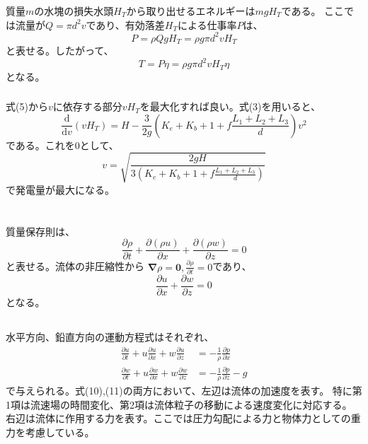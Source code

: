 \documentclass[a4paper]{jsarticle}
\begin{document}
\subsubsection{}
質量$m$の水塊の損失水頭$H_T$から取り出せるエネルギーは$mgH_T$である。
ここでは流量が$Q = \pi d^2 v$であり、有効落差$H_T$による仕事率$P$は、
\begin{equation}
  P = \rho Q g H_T = \rho g \pi d^2 v H_T
\end{equation}
と表せる。したがって、
\begin{equation}
  T = P \eta = \rho g \pi d^2 v H_T \eta
\end{equation}
となる。

\subsubsection{}
式(5)から$v$に依存する部分$v H_T$を最大化すれば良い。式(3)を用いると、
\begin{equation}
  \frac{\mathrm{d}}{\mathrm{d} v}(v H_T)
  = H - \frac{3}{2g} \left(K_e + K_b + 1 + f \frac{L_1 + L_2 + L_3}{d}\right) v^2
\end{equation}
である。これを0として、
\begin{equation}
  v = \sqrt{\frac{2 g H}{3 (K_e + K_b + 1 + f \frac{L_1 + L_2 + L_3}{d})}}
\end{equation}
で発電量が最大になる。

\section{}
\subsection{}
質量保存則は、
\begin{equation}
  \frac{\partial \rho}{\partial t}
  + \frac{\partial (\rho u)}{\partial x} 
  + \frac{\partial (\rho w)}{\partial z} = 0
\end{equation}
と表せる。流体の非圧縮性から
$\boldsymbol{\nabla} \rho = \boldsymbol{0},\frac{\partial \rho}{\partial t} = 0$であり、
\begin{equation}
  \frac{\partial u}{\partial x} 
  + \frac{\partial w}{\partial z} = 0
\end{equation}
となる。

\subsection{}
水平方向、鉛直方向の運動方程式はそれぞれ、
\begin{align}
  \frac{\partial u}{\partial t} + u \frac{\partial u}{\partial x} + w \frac{\partial u}{\partial z} &= -\frac{1}{\rho} \frac{\partial p}{\partial x} \\
  \frac{\partial w}{\partial t} + u \frac{\partial w}{\partial x} + w \frac{\partial w}{\partial z} &= -\frac{1}{\rho} \frac{\partial p}{\partial z} -g
\end{align}
で与えられる。式(10),(11)の両方において、左辺は流体の加速度を表す。
特に第1項は流速場の時間変化、第2項は流体粒子の移動による速度変化に対応する。
右辺は流体に作用する力を表す。ここでは圧力勾配による力と物体力としての重力を考慮している。
\end{document}
